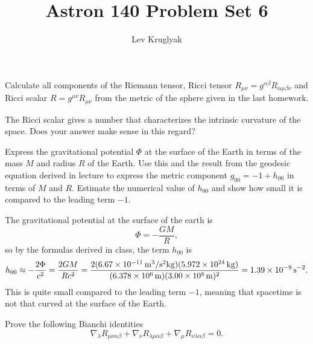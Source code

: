 \documentclass{../../templates/lkx_pset}
\title{Astron 140 Problem Set 6}
\author{Lev Kruglyak}
\begin{document}
\maketitle

\begin{problem}{1}
  Calculate all components of the Riemann tensor, Ricci tensor $R_{\mu\nu} = g^{\alpha\beta}R_{\alpha\mu\beta\nu}$ and Ricci scalar $R = g^{\mu\nu}R_{\mu\nu}$ from the metric of the sphere given in the last homework.
\end{problem}

\begin{parts}
  \begin{part}{}
    The Ricci scalar gives a number that characterizes the intrinsic curvature of the space. Does your answer make sense in this regard?
  \end{part}
\end{parts}

\begin{problem}{3}
  Express the gravitational potential $\Phi$ at the surface of the Earth in terms of the mass $M$ and radius $R$ of the Earth. Use this and the result from the geodesic equation derived in lecture to express the metric component $g_{00} = -1 + h_{00}$ in terms of $M$ and $R$. Estimate the numerical value of $h_{00}$ and show how small it is compared to the leading term $-1$.
\end{problem}

\begin{solution}
  The gravitational potential at the surface of the earth is
  \[
    \Phi = -\frac{GM}{R},
  \]
  so by the formulas derived in class, the term $h_{00}$ is 
  \[
    h_{00} \approx -\frac{2\Phi}{c^2} = \frac{2GM}{Rc^2} = \frac{2(\Gsi{6.67e-11})(\kgsi{5.972e24})}{(\msi{6.378e6})(\msi{3.00e8})^2}=\psssi{1.39e-9}.
  \]
  This is quite small compared to the leading term $-1$, meaning that spacetime is not that curved at the surface of the Earth.
\end{solution}

\begin{problem}{4}
  Prove the following Bianchi identities
  \[
    \nabla_\lambda R_{\mu\nu\alpha\beta} + \nabla_\nu R_{\lambda\mu\alpha\beta} + \nabla_\mu R_{\nu\lambda\alpha\beta} = 0.
  \]
\end{problem}
\end{document}
